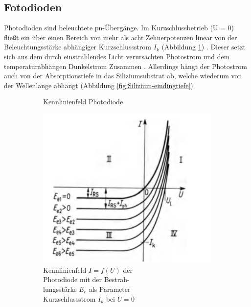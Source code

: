 
\subsection{Fotodioden}
Photodioden sind beleuchtete pn-Übergänge. Im Kurzschlussbetrieb (U = 0) fließt ein über einen Bereich von mehr als acht Zehnerpotenzen linear von der Beleuchtungsstärke abhängiger Kurzschlussstrom $I_k$ (Abbildung \ref{fig:PhotodiodeKennline})
\cite{Aktive_Bauelemente}.
Dieser setzt sich aus dem durch einstrahlendes Licht verursachten Photostrom und dem temperaturabhängen Dunkelstrom Zusammen \cite{Halbleiterelektronik}.
Allerdings hängt der Photostrom auch von der Absorptionstiefe in das Siliziumsubstrat ab, welche wiederum von der Wellenlänge abhängt (Abbildung  \ref{fig:Silizium-eindingtiefe}) \cite{Solarzellenlicht}

\begin{figure}[H]
  \begin{subfigure}[b]{0.4\textwidth}
  \caption{Kennlinienfeld Photodiode \cite{Aktive_Bauelemente}}
    \includegraphics[width=\textwidth]{img/Photodiode-Kennline.png}
    \caption*{Kennlinienfeld $I=f(U)$ der \\Photodiode mit der Bestrah-\\lungsstärke $E_e$ als Parameter\\Kurzschlussstrom $I_k$ bei $U=0$}
    \label{fig:PhotodiodeKennline}
  \end{subfigure}
  \begin{subfigure}[b]{0.55\textwidth}

\end{subfigure}
\end{figure}

